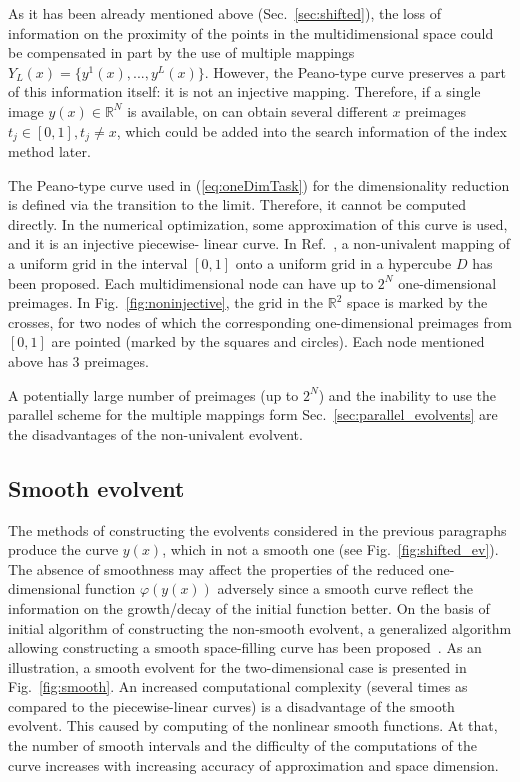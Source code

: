 \documentclass[runningheads]{llncs}
\begin{document}
As it has been already mentioned above (Sec.~\ref{sec:shifted}), the loss of information on the
proximity of the points in the multidimensional space could be compensated in part by the use
of multiple mappings $Y_L(x)=\{y^1(x),...,y^L(x)\}$. However, the Peano-type curve preserves
a part of this information itself: it is not an injective mapping. Therefore, if a single image
$y(x)\in \mathbb{R}^N$ is available, on can obtain several different $x$ preimages
$t_j\in[0,1], t_j \not = x$, which could be added into the search information of the index
method later.

The Peano-type curve used in (\ref{eq:oneDimTask}) for the dimensionality reduction is
defined via the transition to the limit. Therefore, it cannot be computed directly. In the
numerical optimization, some approximation of this curve is used, and it is an injective piecewise-
linear curve. In Ref.~\cite{strongin1978}, a non-univalent mapping of a uniform grid in the
interval $[0,1]$ onto a uniform grid in a hypercube $D$ has been proposed. Each
multidimensional node can have up to $2^N$ one-dimensional preimages. In
Fig.~\ref{fig:noninjective}, the grid in the $\mathbb{R}^2$ space is marked by the crosses, for
two nodes of which the corresponding one-dimensional preimages from $[0,1]$ are pointed
(marked by the squares and circles). Each node mentioned above has 3 preimages.

A potentially large number of preimages (up to $2^N$) and the inability to use the parallel
scheme for the multiple mappings form Sec.~\ref{sec:parallel_evolvents} are the disadvantages
of the non-univalent evolvent.


\subsection{Smooth evolvent}

The methods of constructing the evolvents considered in the previous paragraphs produce the
curve $y(x)$, which in not a smooth one (see Fig.~\ref{fig:shifted_ev}). The absence of
smoothness may affect the properties of the reduced one-dimensional function $\varphi(y(x))$
adversely since a smooth curve reflect the information on the growth/decay of the initial
function better. On the basis of initial algorithm of constructing the non-smooth evolvent, a
generalized algorithm allowing constructing a smooth space-filling curve has been
proposed~\cite{Goryachih2017}. As an illustration, a smooth evolvent for the two-dimensional
case is presented in Fig.~\ref{fig:smooth}.
An increased computational complexity (several times as compared to the piecewise-linear
curves) is a disadvantage of the smooth evolvent. This caused by computing of the nonlinear smooth
functions. At that, the number of smooth intervals and the difficulty of the
computations of the curve increases with increasing accuracy of approximation and
space dimension.
\end{document}
